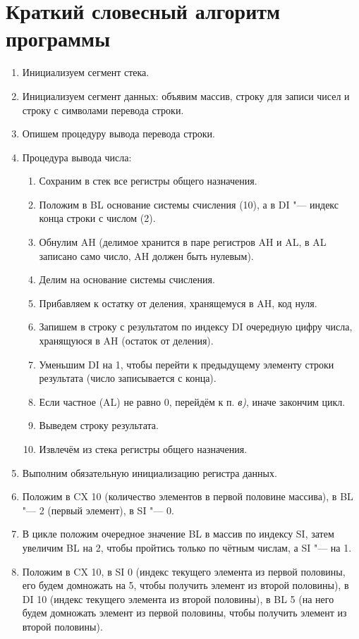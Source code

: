 \documentclass[bachelor, och, otchet]{../SCWorks}
\begin{document}
\section{Краткий словесный алгоритм программы}
\begin{enumerate}
\item Инициализуем сегмент стека.
\item Инициализуем сегмент данных: объявим массив, строку для записи чисел и строку с символами перевода строки.
\item Опишем процедуру вывода перевода строки.
\item Процедура вывода числа:
\begin{enumerate}
	\item Сохраним в стек все регистры общего назначения.
	\item Положим в BL основание системы счисления (10), а в DI "--- индекс конца строки с числом (2).
	\item Обнулим AH (делимое хранится в паре регистров AH и AL, в AL записано само число, AH должен быть нулевым).
	\item Делим на основание системы счисления.
	\item Прибавляем к остатку от деления, хранящемуся в AH, код нуля.
	\item Запишем в строку с результатом по индексу DI очередную цифру числа, хранящуюся в AH (остаток от деления).
	\item Уменьшим DI на 1, чтобы перейти к предыдущему элементу строки результата (число записывается с конца).
	\item Если частное (AL) не равно 0, перейдём к п. \textit{в)}, иначе закончим цикл.
	\item Выведем строку результата.
	\item Извлечём из стека регистры общего назначения.
\end{enumerate}
\item Выполним обязательную инициализацию регистра данных.
\item Положим в CX 10 (количество элементов в первой половине массива), в BL "--- 2 (первый элемент), в SI "--- 0.
\item В цикле положим очередное значение BL в массив по индексу SI, затем увеличим BL на 2, чтобы пройтись только по чётным числам, а SI "--- на 1.
\item Положим в CX 10, в SI 0 (индекс текущего элемента из первой половины, его будем домножать на 5, чтобы получить элемент из второй половины), в DI 10 (индекс текущего элемента из второй половины), в BL 5 (на него будем домножать элемент из первой половины, чтобы получить элемент из второй половины).

\end{enumerate}
\end{document}
